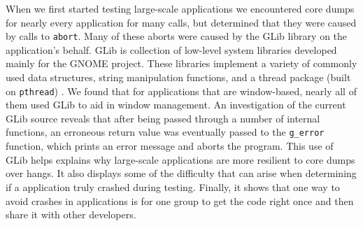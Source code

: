 When we first started testing large-scale applications we encountered core dumps for nearly every application for many calls, but determined that they were caused by calls to \texttt{abort}. Many of these aborts were caused by the GLib library on the application's behalf. GLib is collection of low-level system libraries developed mainly for the GNOME project. These libraries implement a variety of commonly used data structures, string manipulation functions, and a thread package (built on \texttt{pthread}) \cite{glibman}. We found that for applications that are window-based, nearly all of them used GLib to aid in window management. An investigation of the current GLib source reveals that after being passed through a number of internal functions, an erroneous return value was eventually passed to the \texttt{g\_error} function, which prints an error message and aborts the program. This use of GLib helps explains why large-scale applications are more resilient to core dumps over hangs. It also displays some of the difficulty that can arise when determining if a application truly crashed during testing. Finally, it shows that one way to avoid crashes in applications is for one group to get the code right once and then share it with other developers.



